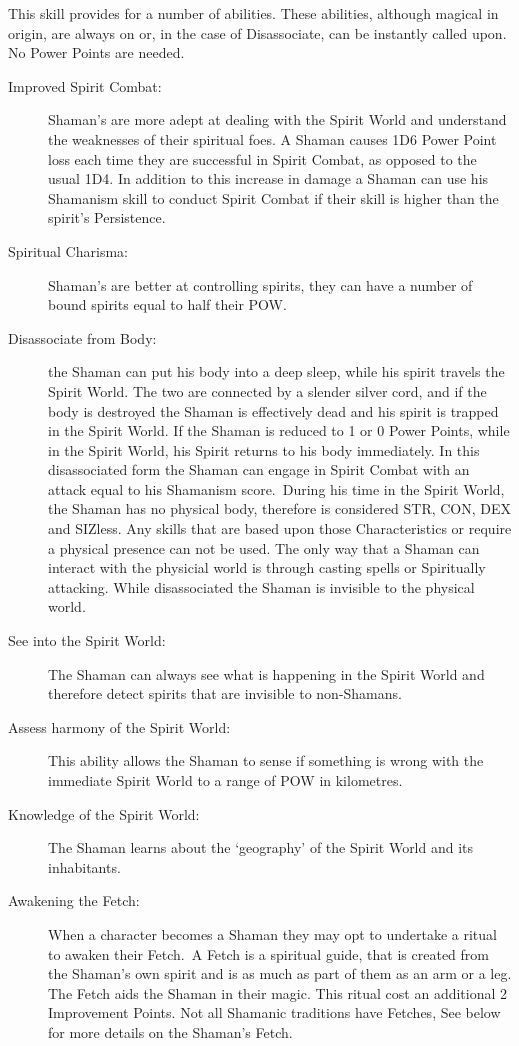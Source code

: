 This skill provides for a number of abilities. These abilities, although magical in origin, are always on or, in the case of Disassociate, can be instantly called upon. No Power Points are needed.

\begin{description}
\item[Improved Spirit Combat:] Shaman’s are more adept at dealing with the Spirit World and understand the weaknesses of their spiritual foes. A Shaman causes 1D6 Power Point loss each time they are successful in Spirit Combat, as opposed to the usual 1D4. In addition to this increase in damage a Shaman can use his Shamanism skill to conduct Spirit Combat if their skill is higher than the spirit’s Persistence.
\item[Spiritual Charisma:] Shaman’s are better at controlling spirits, they can have a number of bound spirits equal to half their POW.
\item[Disassociate from Body:] the Shaman can put his body into a deep sleep, while his spirit travels the Spirit World. The two are connected by a slender silver cord, and if the body is destroyed the Shaman is effectively dead and his spirit is trapped in the Spirit World. If the Shaman is reduced to 1 or 0 Power Points, while in the Spirit World, his Spirit returns to his body immediately. In this disassociated form the Shaman can engage in Spirit Combat with an attack equal to his Shamanism score. During his time in the Spirit World, the Shaman has no physical body, therefore is considered STR, CON, DEX and SIZless. Any skills that are based upon those Characteristics or require a physical presence can not be used. The only way that a Shaman can interact with the physicial world is through casting spells or Spiritually attacking. While disassociated the Shaman is invisible to the physical world.
\item[See into the Spirit World:] The Shaman can always see what is happening in the Spirit World and therefore detect spirits that are invisible to non-Shamans.
\item[Assess harmony of the Spirit World:] This ability allows the Shaman to sense if something is wrong with the immediate Spirit World to a range of POW in kilometres. 
\item[Knowledge of the Spirit World:] The Shaman learns about the ‘geography’ of the Spirit World and its inhabitants.
\item[Awakening the Fetch:] When a character becomes a Shaman they may opt to undertake a ritual to awaken their Fetch. A Fetch is a spiritual guide, that is created from the Shaman’s own spirit and is as much as part of them as an arm or a leg. The Fetch aids the Shaman in their magic. This ritual cost an additional 2 Improvement Points. Not all Shamanic traditions have Fetches, See below for more details on the Shaman’s Fetch.  
\end{description}


